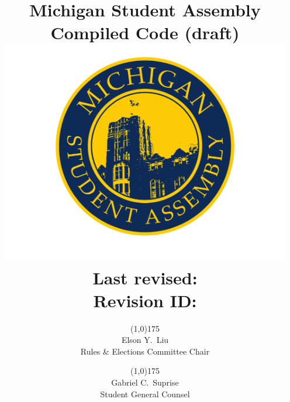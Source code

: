 \documentclass{code}
\begin{document}
	\renewcommand{\thepage}{\roman{page}}
	\title{Michigan Student Assembly Compiled Code (draft) \\
			\large \includegraphics[width=5in]{2008_msa_color_logo} \\
			Last revised: \VCDateISO \\
			Revision ID: {\tt \GITAbrHash} \\
			}
	\author{\line(1,0){175} \\
			Elson Y.~Liu \\
			Rules \& Elections Committee Chair
				\and
			\line(1,0){175} \\
			Gabriel C.~Suprise \\
			Student General Counsel}
	\date{}
	\maketitle
	\tableofcontents
	\newpage

	\renewcommand{\thepage}{\arabic{page}}
	\setcounter{page}{1}
	\pagestyle{fancy}
	\headheight 35pt
	\thispagestyle{empty}
	\linenumbers

	
	
	
	
	
	
	
	
	
	
	
	
	
\end{document}
